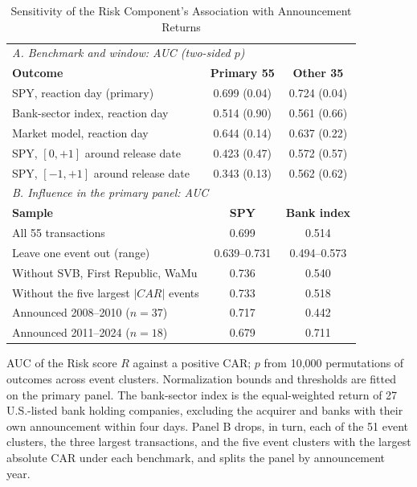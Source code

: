 \begin{table}[!t]
\caption{Sensitivity of the Risk Component's Association with Announcement Returns}
\label{tab:risk}
\centering
\footnotesize
\setlength{\tabcolsep}{3pt}
\begin{tabular}{lcc}
\toprule
\multicolumn{3}{l}{\textit{A. Benchmark and window: AUC (two-sided $p$)}} \\
\textbf{Outcome} & \textbf{Primary 55} & \textbf{Other 35} \\
\midrule
SPY, reaction day (primary) & 0.699 (0.04) & 0.724 (0.04) \\
Bank-sector index, reaction day & 0.514 (0.90) & 0.561 (0.66) \\
Market model, reaction day & 0.644 (0.14) & 0.637 (0.22) \\
SPY, $[0,+1]$ around release date & 0.423 (0.47) & 0.572 (0.57) \\
SPY, $[-1,+1]$ around release date & 0.343 (0.13) & 0.562 (0.62) \\
\midrule
\multicolumn{3}{l}{\textit{B. Influence in the primary panel: AUC}} \\
\textbf{Sample} & \textbf{SPY} & \textbf{Bank index} \\
\midrule
All 55 transactions & 0.699 & 0.514 \\
Leave one event out (range) & 0.639--0.731 & 0.494--0.573 \\
Without SVB, First Republic, WaMu & 0.736 & 0.540 \\
Without the five largest $|CAR|$ events & 0.733 & 0.518 \\
Announced 2008--2010 ($n=37$) & 0.717 & 0.442 \\
Announced 2011--2024 ($n=18$) & 0.679 & 0.711 \\
\bottomrule
\end{tabular}
\par\vspace{2pt}\parbox{0.94\columnwidth}{\scriptsize AUC of the Risk score $R$ against a positive CAR; $p$ from 10,000 permutations of
outcomes across event clusters. Normalization bounds and thresholds are fitted on the primary panel. The bank-sector index is the
equal-weighted return of 27 U.S.-listed bank holding companies, excluding the acquirer and banks with their own announcement
within four days. Panel B drops, in turn, each of the 51 event clusters, the three largest transactions, and the five event
clusters with the largest absolute CAR under each benchmark, and splits the panel by announcement year.}
\end{table}
